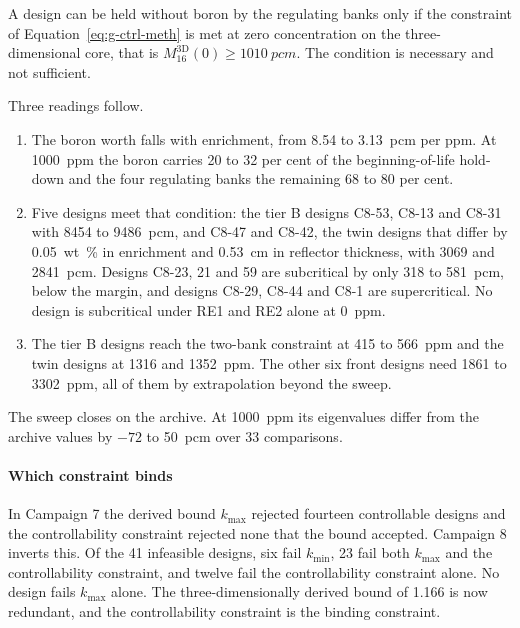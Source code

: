 A design can be held without boron by the regulating banks only if the
constraint of Equation~\eqref{eq:g-ctrl-meth} is met at zero concentration
on the three-dimensional core, that is
$M_{16}^\mathrm{3D}(0) \ge \SI{1010}{pcm}$. The condition is necessary
and not sufficient.

Three readings follow.

\begin{enumerate}
  \item The boron worth falls with enrichment, from 8.54 to
        \SI{3.13}{pcm} per ppm. At \SI{1000}{ppm} the boron carries 20
        to 32 per cent of the beginning-of-life hold-down and the four
        regulating banks the remaining 68 to 80 per cent.

  \item Five designs meet that condition: the
        tier B designs C8-53, C8-13 and C8-31 with 8454 to \SI{9486}{pcm},
        and C8-47 and C8-42, the twin designs that differ by
        \SI{0.05}{wt\%} in enrichment and \SI{0.53}{cm} in reflector
        thickness, with 3069 and \SI{2841}{pcm}. Designs C8-23,
        21 and 59 are subcritical by only 318 to \SI{581}{pcm}, below
        the margin, and designs C8-29, C8-44 and C8-1 are supercritical. No
        design is subcritical under RE1 and RE2 alone at \SI{0}{ppm}.

  \item The tier B designs reach the two-bank constraint at 415 to
        \SI{566}{ppm} and the twin designs at 1316 and \SI{1352}{ppm}. The
        other six front designs need 1861 to \SI{3302}{ppm}, all of
        them by extrapolation beyond the sweep.
\end{enumerate}

The sweep closes on the archive. At \SI{1000}{ppm} its eigenvalues
differ from the archive values by $-72$ to \SI{+50}{pcm} over 33
comparisons.

\paragraph{Which constraint binds}
\label{sec:res-c8-nesting}

In Campaign 7 the derived bound $k_{\max}$ rejected fourteen
controllable designs and the controllability constraint rejected none that the
bound accepted. Campaign 8 inverts this. Of the 41 infeasible designs,
six fail $k_{\min}$, 23 fail both $k_{\max}$ and the controllability constraint, and
twelve fail the controllability constraint alone. No design fails $k_{\max}$ alone.
The three-dimensionally derived bound of 1.166 is now redundant,
and the controllability constraint is the binding constraint.

